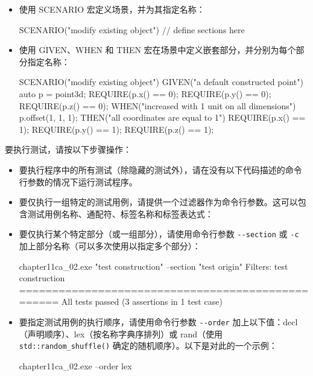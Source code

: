 \begin{itemize}
\item
使用 SCENARIO 宏定义场景，并为其指定名称：

\begin{cpp}
SCENARIO("modify existing object")
{
    // define sections here
}
\end{cpp}

\item
使用 GIVEN、WHEN 和 THEN 宏在场景中定义嵌套部分，并分别为每个部分指定名称：

\begin{cpp}
SCENARIO("modify existing object")
{
    GIVEN("a default constructed point")
    {
        auto p = point3d{};
        REQUIRE(p.x() == 0);
        REQUIRE(p.y() == 0);
        REQUIRE(p.z() == 0);
        WHEN("increased with 1 unit on all dimensions")
        {
            p.offset(1, 1, 1);
            THEN("all coordinates are equal to 1")
            {
                REQUIRE(p.x() == 1);
                REQUIRE(p.y() == 1);
                REQUIRE(p.z() == 1);
            }
        }
    }
}
\end{cpp}
\end{itemize}

要执行测试，请按以下步骤操作：

\begin{itemize}
\item
要执行程序中的所有测试（除隐藏的测试外），请在没有以下代码描述的命令行参数的情况下运行测试程序。

\item
要仅执行一组特定的测试用例，请提供一个过滤器作为命令行参数。这可以包含测试用例名称、通配符、标签名称和标签表达式：


\item
要仅执行某个特定部分（或一组部分），请使用命令行参数 \verb|--section| 或 \verb|-c| 加上部分名称（可以多次使用以指定多个部分）：

\begin{cpp}
chapter11ca_02.exe "test construction" --section "test origin"
Filters: test construction
==================================================
All tests passed (3 assertions in 1 test case)
\end{cpp}

\item
要指定测试用例的执行顺序，请使用命令行参数 \verb|--order| 加上以下值：decl（声明顺序）、lex（按名称字典序排列）或 rand（使用 \verb|std::random_shuffle()| 确定的随机顺序）。以下是对此的一个示例：

\begin{shell}
chapter11ca_02.exe --order lex
\end{shell}
\end{itemize}

